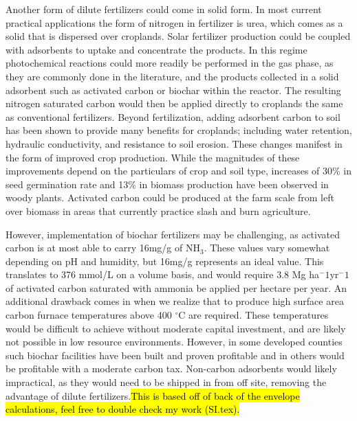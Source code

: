 Another form of dilute fertilizers could come in solid form. In most current practical applications the form of nitrogen in fertilizer is urea, which comes as a solid that is dispersed over croplands. Solar fertilizer production could be coupled with adsorbents to uptake and concentrate the products. In this regime photochemical reactions could more readily be performed in the gas phase, as they are commonly done in the literature,\cite{Schrauzer_1983} and the products collected in a solid adsorbent such as activated carbon or biochar within the reactor. The resulting nitrogen saturated carbon would then be applied directly to croplands the same as conventional fertilizers. Beyond fertilization, adding adsorbent carbon to soil has been shown to provide many benefits for croplands; including water retention, hydraulic conductivity, and resistance to soil erosion.\cite{Li2018} These changes manifest in the form of improved crop production.\cite{Glaser2002} While the magnitudes of these improvements depend on the particulars of crop and soil type, increases of 30\% in seed germination rate and 13\% in biomass production have been observed in woody plants.\cite{Chidumayo_1994} Activated carbon could be produced at the farm scale from left over biomass in areas that currently practice slash and burn agriculture.

However, implementation of biochar fertilizers may be challenging, as activated carbon is at most able to carry 16mg/g of NH$_3$.\cite{Gon_alves_2011} These values vary somewhat depending on pH and humidity, but 16mg/g represents an ideal value.\cite{} This translates to 376 mmol/L on a volume basis, and would require 3.8 Mg ha$^-1$yr$^-1$ of activated carbon saturated with ammonia be applied per hectare per year. An additional drawback comes in when we realize that to produce high surface area carbon furnace temperatures above 400 $^\circ$C are required.\cite{Lehmann2007} These temperatures would be difficult to achieve without moderate capital investment, and are likely not possible in low resource environments. However, in some developed counties such biochar facilities have been built and proven profitable and in others would be profitable with a moderate carbon tax.\cite{McHenry2009,Galinato2011} Non-carbon adsorbents would likely impractical, as they would need to be shipped in from off site, removing the advantage of dilute fertilizers.\hl{This is based off of back of the envelope calculations, feel free to double check my work (SI.tex).}

